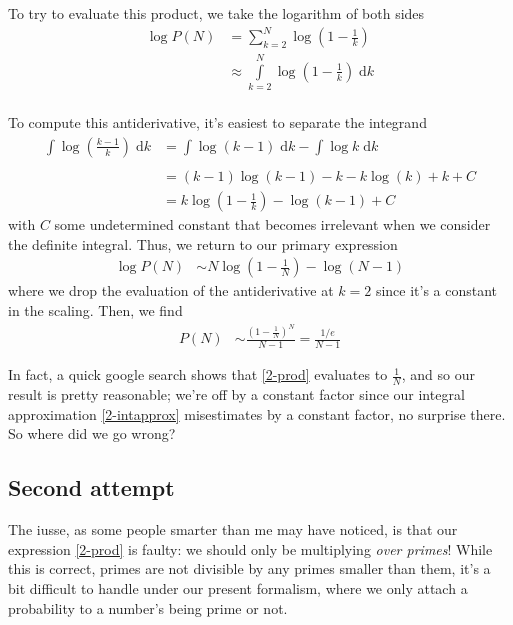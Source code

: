 \documentclass[12pt]{report}
\begin{document}
To try to evaluate this product, we take the logarithm of both sides
\begin{align}
    \log P(N) &= \sum\limits_{k=2}^{N} \log \left( 1 - \frac{1}{k}
    \right)\\\label{2-intapprox}
    &\approx \int\limits_{k=2}^{N}\log \left( 1 - \frac{1}{k} \right)\;\mathrm{d}k\\
\end{align}

To compute this antiderivative, it's easiest to separate the integrand
\begin{align}
    \int\limits_{}^{}\log\left( \frac{k-1}{k} \right)\;\mathrm{d}k &=
    \int\limits_{}^{}\log (k-1)\;\mathrm{d}k - \int\limits_{}^{}\log
    k\;\mathrm{d}k\\
    &= (k-1)\log(k-1) - k - k\log(k) + k + C\\
    &= k\log\left( 1 - \frac{1}{k} \right) - \log(k-1) + C
\end{align}
with $C$ some undetermined constant that becomes irrelevant when we consider the
definite integral. Thus, we return to our primary expression
\begin{align}
    \log P(N) &\sim N\log\left( 1 - \frac{1}{N} \right) - \log(N - 1)
\end{align}
where we drop the evaluation of the antiderivative at $k=2$ since it's a
constant in the scaling. Then, we find
\begin{align}
    P(N) &\sim \frac{\left( 1 - \frac{1}{N} \right)^N}{N-1} =
    \frac{1/e}{N-1}
\end{align}

In fact, a quick google search shows that \autoref{2-prod} evaluates to
$\frac{1}{N}$, and so our result is pretty reasonable; we're off by a constant
factor since our integral approximation \autoref{2-intapprox} misestimates by a
constant factor, no surprise there. So where did we go wrong?

\subsection{Second attempt}

The iusse, as some people smarter than me may have noticed, is that our
expression \autoref{2-prod} is faulty: we should only be multiplying \emph{over
primes}! While this is correct, primes are not divisible by any primes smaller
than them, it's a bit difficult to handle under our present formalism, where we
only attach a probability to a number's being prime or not.
\end{document}
